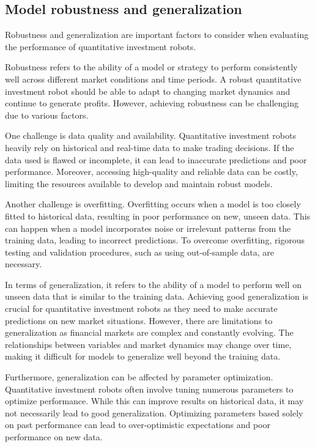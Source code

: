 \documentclass[UTF8]{ctexart}
\begin{document}
\subsection{Model robustness and generalization}
Robustness and generalization are important factors to consider when evaluating the performance of quantitative investment robots.

Robustness refers to the ability of a model or strategy to perform consistently well across different market conditions and time periods. A robust quantitative investment robot should be able to adapt to changing market dynamics and continue to generate profits. However, achieving robustness can be challenging due to various factors.

One challenge is data quality and availability. Quantitative investment robots heavily rely on historical and real-time data to make trading decisions. If the data used is flawed or incomplete, it can lead to inaccurate predictions and poor performance. Moreover, accessing high-quality and reliable data can be costly, limiting the resources available to develop and maintain robust models.

Another challenge is overfitting. Overfitting occurs when a model is too closely fitted to historical data, resulting in poor performance on new, unseen data. This can happen when a model incorporates noise or irrelevant patterns from the training data, leading to incorrect predictions. To overcome overfitting, rigorous testing and validation procedures, such as using out-of-sample data, are necessary.

In terms of generalization, it refers to the ability of a model to perform well on unseen data that is similar to the training data. Achieving good generalization is crucial for quantitative investment robots as they need to make accurate predictions on new market situations. However, there are limitations to generalization as financial markets are complex and constantly evolving. The relationships between variables and market dynamics may change over time, making it difficult for models to generalize well beyond the training data.

Furthermore, generalization can be affected by parameter optimization. Quantitative investment robots often involve tuning numerous parameters to optimize performance. While this can improve results on historical data, it may not necessarily lead to good generalization. Optimizing parameters based solely on past performance can lead to over-optimistic expectations and poor performance on new data.
\end{document}
